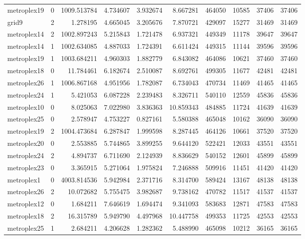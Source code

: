 \begin{longtable}{|l|r|r|r|r|r|r|r|r|r|}
metroplex19 & 0 & 1009.513784 & 4.734607 & 3.932674 & 8.667281 & 464050 & 10585 & 37406 & 37406 \\
grid9 & 2 & 1.278195 & 4.665045 & 3.205676 & 7.870721 & 429097 & 15277 & 31469 & 31469 \\
metroplex14 & 2 & 1002.897243 & 5.215843 & 1.721478 & 6.937321 & 449349 & 11178 & 39647 & 39647 \\
metroplex14 & 1 & 1002.634085 & 4.887033 & 1.724391 & 6.611424 & 449315 & 11144 & 39596 & 39596 \\
metroplex19 & 1 & 1003.684211 & 4.960303 & 1.882779 & 6.843082 & 464086 & 10621 & 37460 & 37460 \\
metroplex18 & 0 & 11.784461 & 6.182674 & 2.510087 & 8.692761 & 499305 & 11677 & 42481 & 42481 \\
metroplex26 & 1 & 1006.867168 & 4.951956 & 1.782087 & 6.734043 & 470734 & 11469 & 41465 & 41465 \\
metroplex24 & 1 & 5.421053 & 6.087228 & 2.239483 & 8.326711 & 540110 & 12559 & 45836 & 45836 \\
metroplex10 & 0 & 8.025063 & 7.022980 & 3.836363 & 10.859343 & 484885 & 11724 & 41639 & 41639 \\
metroplex25 & 0 & 2.578947 & 4.753227 & 0.827161 & 5.580388 & 465048 & 10162 & 36090 & 36090 \\
metroplex19 & 2 & 1004.473684 & 6.287847 & 1.999598 & 8.287445 & 464126 & 10661 & 37520 & 37520 \\
metroplex20 & 0 & 2.553885 & 5.744865 & 3.899255 & 9.644120 & 522421 & 12033 & 43551 & 43551 \\
metroplex24 & 2 & 4.894737 & 6.711690 & 2.124939 & 8.836629 & 540152 & 12601 & 45899 & 45899 \\
metroplex23 & 0 & 3.365915 & 5.271064 & 1.975824 & 7.246888 & 509916 & 11451 & 41420 & 41420 \\
metroplex1 & 0 & 4003.814536 & 5.942984 & 2.371716 & 8.314700 & 589424 & 13167 & 48138 & 48138 \\
metroplex26 & 2 & 10.072682 & 5.755475 & 3.982687 & 9.738162 & 470782 & 11517 & 41537 & 41537 \\
metroplex12 & 0 & 1.684211 & 7.646619 & 1.694474 & 9.341093 & 583683 & 12871 & 47583 & 47583 \\
metroplex18 & 2 & 16.315789 & 5.949790 & 4.497968 & 10.447758 & 499353 & 11725 & 42553 & 42553 \\
metroplex25 & 1 & 2.684211 & 4.206628 & 1.282362 & 5.488990 & 465098 & 10212 & 36165 & 36165 \\

\end{longtable}
